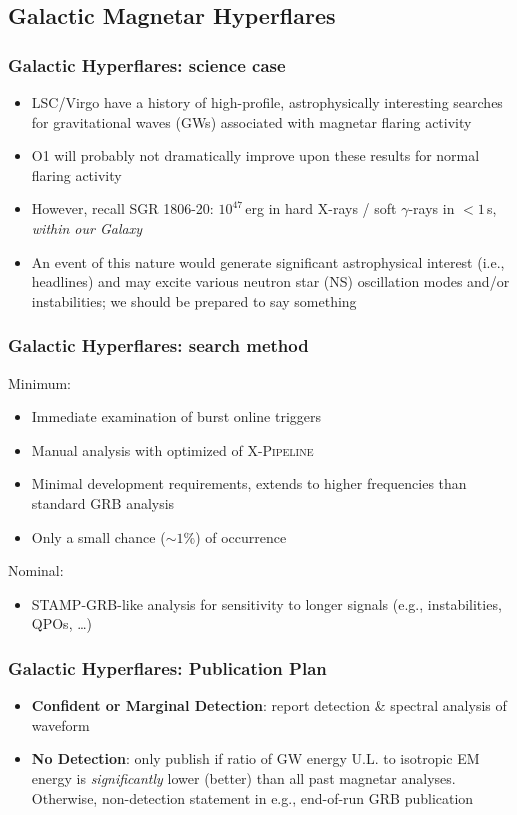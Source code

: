 \documentclass{beamer}
\def\gw#1{gravitational wave#1 (GW#1)\gdef\gw{GW}}
\def\ns#1{neutron star#1 (NS#1)\gdef\ns{NS}}
\begin{document}
\subsection{Galactic Magnetar Hyperflares}
\begin{frame}
    \frametitle{Galactic Hyperflares: science case}
    \begin{itemize}
        \item LSC/Virgo have a history of high-profile, astrophysically interesting
            searches for \gw{s} associated with magnetar flaring activity

        \item O1 will probably not dramatically improve upon these results for
            normal flaring activity

        \item However, recall SGR 1806-20: $10^{47}$\,erg in hard X-rays / soft $\gamma$-rays in
            $<1$\,s, \emph{within our Galaxy}

        \item An event of this nature would generate significant astrophysical
            interest (i.e., headlines) and may excite various \ns{} oscillation
            modes and/or instabilities; we should be prepared to say something
    \end{itemize}
\end{frame}

\begin{frame}
    \frametitle{Galactic Hyperflares: search method}
    Minimum:
    \begin{itemize}
        \item Immediate examination of burst online triggers
        \item Manual analysis with optimized of \textsc{X-Pipeline}
        \item Minimal development requirements, extends to higher frequencies
            than standard GRB analysis
        \item Only a small chance ($\sim 1\%$) of occurrence
    \end{itemize}
    Nominal:
    \begin{itemize}
        \item STAMP-GRB-like analysis for sensitivity to longer signals (e.g.,
            instabilities, QPOs, \dots)
    \end{itemize}
\end{frame}

\begin{frame}
    \frametitle{Galactic Hyperflares: Publication Plan}
    \begin{itemize}
        \item {\bf Confident or Marginal Detection}: report detection \&
            spectral analysis of waveform 
        \item {\bf No Detection}: only publish if ratio of \gw{} energy U.L. to
            isotropic EM energy is \emph{significantly} lower (better) than all
            past magnetar analyses.  Otherwise, non-detection statement in e.g.,
            end-of-run GRB publication
    \end{itemize}
\end{frame}
\end{document}
